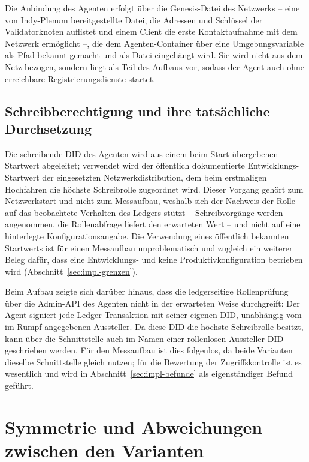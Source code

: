 Die Anbindung des Agenten erfolgt über die Genesis-Datei des Netzwerks -- eine von Indy-Plenum bereitgestellte Datei, die Adressen und Schlüssel der Validatorknoten auflistet und einem Client die erste Kontaktaufnahme mit dem Netzwerk ermöglicht --, die dem Agenten-Container über eine Umgebungsvariable als Pfad bekannt gemacht und als Datei eingehängt wird. Sie wird nicht aus dem Netz bezogen, sondern liegt als Teil des Aufbaus vor, sodass der Agent auch ohne erreichbare Registrierungsdienste startet.

\subsection{Schreibberechtigung und ihre tatsächliche Durchsetzung}
\label{subsec:impl-indy-berechtigung}

Die schreibende DID des Agenten wird aus einem beim Start übergebenen Startwert abgeleitet; verwendet wird der öffentlich dokumentierte Entwicklungs-Startwert der eingesetzten Netzwerkdistribution, dem beim erstmaligen Hochfahren die höchste Schreibrolle zugeordnet wird. Dieser Vorgang gehört zum Netzwerkstart und nicht zum Messaufbau, weshalb sich der Nachweis der Rolle auf das beobachtete Verhalten des Ledgers stützt -- Schreibvorgänge werden angenommen, die Rollenabfrage liefert den erwarteten Wert -- und nicht auf eine hinterlegte Konfigurationsangabe. Die Verwendung eines öffentlich bekannten Startwerts ist für einen Messaufbau unproblematisch und zugleich ein weiterer Beleg dafür, dass eine Entwicklungs- und keine Produktivkonfiguration betrieben wird (Abschnitt~\ref{sec:impl-grenzen}).

Beim Aufbau zeigte sich darüber hinaus, dass die ledgerseitige Rollenprüfung über die Admin-API des Agenten nicht in der erwarteten Weise durchgreift: Der Agent signiert jede Ledger-Transaktion mit seiner eigenen DID, unabhängig vom im Rumpf angegebenen Aussteller. Da diese DID die höchste Schreibrolle besitzt, kann über die Schnittstelle auch im Namen einer rollenlosen Aussteller-DID geschrieben werden. Für den Messaufbau ist dies folgenlos, da beide Varianten dieselbe Schnittstelle gleich nutzen; für die Bewertung der Zugriffskontrolle ist es wesentlich und wird in Abschnitt~\ref{sec:impl-befunde} als eigenständiger Befund geführt.

\section{Symmetrie und Abweichungen zwischen den Varianten}
\label{sec:impl-symmetrie}

